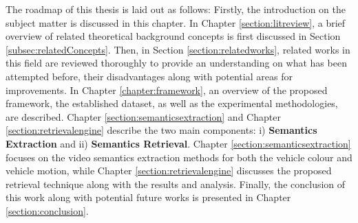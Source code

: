
The roadmap of this thesis is laid out as follows: Firstly, the introduction on the subject matter is discussed in this chapter.
In Chapter \ref{section:litreview}, a brief overview of related theoretical
background concepts is first discussed in Section \ref{subsec:relatedConcepts}.
Then, in Section \ref{section:relatedworks}, related works in this field are
reviewed thoroughly to provide an understanding on what has been attempted before, their disadvantages along with potential areas for improvements.
In Chapter \ref{chapter:framework}, an overview of the proposed framework, the established dataset, as well as the experimental methodologies, are described.
Chapter \ref{section:semanticsextraction} and Chapter \ref{section:retrievalengine} describe the two main components: i) \textbf{Semantics Extraction} and ii) \textbf{Semantics Retrieval}.
Chapter \ref{section:semanticsextraction} focuses on the video semantics extraction methods for both the vehicle colour and vehicle motion, while Chapter \ref{section:retrievalengine} discusses the proposed retrieval technique along with the results and analysis.
Finally, the conclusion of this work along with potential future works is presented in Chapter \ref{section:conclusion}.

